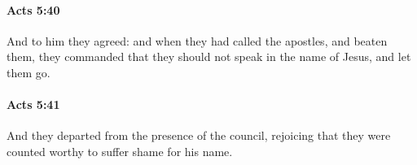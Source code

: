 		\paragraph{Acts 5:40} %
			\label{ACTS-5-40}

			And to him they agreed: and when they had called the apostles, and beaten them, they commanded that they should not speak in the name of Jesus, and let them go.

			\begin{framed}
			\scriptsize
				\begin{compactdesc}
					\item[SBLG] 
				\end{compactdesc}
			\end{framed}

		\paragraph{Acts 5:41} %
			\label{ACTS-5-41}

			And they departed from the presence of the council, rejoicing that they were counted worthy to suffer shame for his name.


